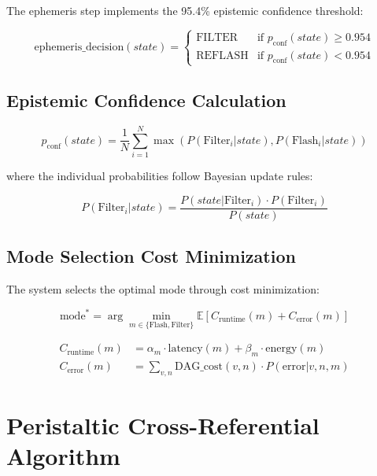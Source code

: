 \documentclass[11pt]{article}
\begin{document}
The ephemeris step implements the 95.4\% epistemic confidence threshold:

\begin{equation}
\text{ephemeris\_decision}(state) = \begin{cases}
\text{FILTER} & \text{if } p_{\text{conf}}(state) \geq 0.954 \\
\text{REFLASH} & \text{if } p_{\text{conf}}(state) < 0.954
\end{cases}
\end{equation}

\subsection{Epistemic Confidence Calculation}

\begin{equation}
p_{\text{conf}}(state) = \frac{1}{N} \sum_{i=1}^{N} \max\left( P(\text{Filter}_i | state), P(\text{Flash}_i | state) \right)
\end{equation}

where the individual probabilities follow Bayesian update rules:

\begin{equation}
P(\text{Filter}_i | state) = \frac{P(state | \text{Filter}_i) \cdot P(\text{Filter}_i)}{P(state)}
\end{equation}

\subsection{Mode Selection Cost Minimization}

The system selects the optimal mode through cost minimization:

\begin{equation}
\text{mode}^* = \arg\min_{m \in \{\text{Flash}, \text{Filter}\}} \mathbb{E}\left[ C_{\text{runtime}}(m) + C_{\text{error}}(m) \right]
\end{equation}

\begin{align}
C_{\text{runtime}}(m) &= \alpha_m \cdot \text{latency}(m) + \beta_m \cdot \text{energy}(m) \\
C_{\text{error}}(m) &= \sum_{v,n} \text{DAG\_cost}(v,n) \cdot P(\text{error} | v,n,m)
\end{align}

\section{Peristaltic Cross-Referential Algorithm}
\end{document}
